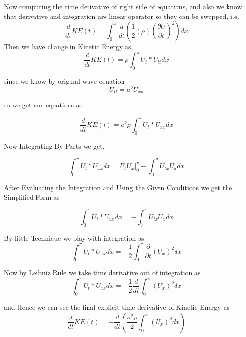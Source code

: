 Now computing the time derivative of right side of equations, and also we know that derivative and integration are linear operator so they can be swapped, i.e.
\begin{equation}
     \frac{d}{dt}KE(t) = \int_{0}^{\pi}\frac{d}{dt} \left( \frac{1}{2}(\rho) \left(\frac{\partial U}{\partial t}\right)^2 \right) dx
\end{equation}
Then we have change in Kinetic Energy as,
\begin{equation}
     \frac{d}{dt}KE(t) = \rho \int_{0}^{\pi}U_{t} * U_{tt} dx
\end{equation}

since we know by original wave equation
\begin{equation}
     U_{tt} = a^2 U_{xx}
\end{equation}

so we get our equations as

\begin{equation}
     \frac{d}{dt}KE(t) = a^2 \rho  \int_{0}^{\pi}U_{t} * U_{xx} dx
\end{equation}

Now Integrating By Parts we get,

\begin{equation}
     \int_{0}^{\pi}U_{t} * U_{xx} dx = U_{t}U_{x}\Big|_{0}^{\pi} - \int_{0}^{\pi}U_{tx}U_{x}dx
\end{equation}

After Evaluating the Integration and Using the Given Conditions we get the Simplified Form as 

\begin{equation}
     \int_{0}^{\pi}U_{t} * U_{xx} dx =  - \int_{0}^{\pi}U_{tx}U_{x}dx
\end{equation}

By little Technique we play with integration as 
\begin{equation}
     \int_{0}^{\pi}U_{t} * U_{xx} dx =  -\frac{1}{2} \int_{0}^{\pi}\frac{\partial}{\partial t}(U_{x})^2dx
\end{equation}

Now by Leibniz Rule we take time derivative out of integration as
\begin{equation}
     \int_{0}^{\pi}U_{t} * U_{xx} dx =  -\frac{1}{2}\frac{d}{dt} \int_{0}^{\pi}(U_{x})^2dx
\end{equation}

and Hence we can see the final explicit time derivative of Kinetic Energy as
\begin{equation}
     \frac{d}{dt} KE(t) =  -\frac{d}{dt}\left( \frac{a^2 \rho}{2} \int_{0}^{\pi}(U_{x})^2dx \right)
\end{equation}


